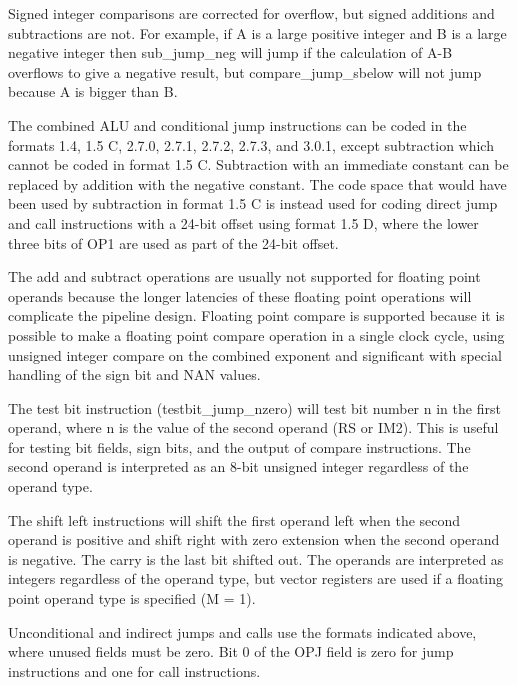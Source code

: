 \documentclass[forwardcom.tex]{subfiles}
\begin{document}
Signed integer comparisons are corrected for overflow, but signed additions and subtractions are not. For example, if A is a large positive integer and B is a large negative integer then sub\_jump\_neg will jump if the calculation of A-B overflows to give a negative result, but compare\_jump\_sbelow will not jump because A is bigger than B.
\vspace{2mm}

The combined ALU and conditional jump instructions can be coded in the formats 1.4, 1.5 C, 2.7.0, 2.7.1, 2.7.2, 2.7.3, and 3.0.1, except subtraction which cannot be coded in format 1.5 C. Subtraction with an immediate constant can be replaced by addition with the negative constant. The code space that would have been used by subtraction in format 1.5 C is instead used for coding direct jump and call instructions with a 24-bit offset using format 1.5 D, where the lower three bits of OP1 are used as part of the 24-bit offset.
\vspace{2mm}

The add and subtract operations are usually not supported for floating point operands because the longer latencies of these floating point operations will complicate the pipeline design. Floating point compare is supported because it is possible to make a floating point compare operation in a single clock cycle, using unsigned integer compare on the combined exponent and significant with special handling of the sign bit and NAN values.
\vspace{2mm}

The test bit instruction (testbit\_jump\_nzero) will test bit number n in the first operand, where n is the value of the second operand (RS or IM2). This is useful for testing bit fields, sign bits, and the output of compare instructions. The second operand is interpreted as an 8-bit unsigned integer regardless of the operand type.
\vspace{2mm}

The shift left instructions will shift the first operand left when the second operand is positive and shift right with zero extension when the second operand is negative. The carry is the last bit shifted out. The operands are interpreted as integers regardless of the operand type, but vector registers are used if a floating point operand type is specified (M = 1).
\vspace{2mm}

Unconditional and indirect jumps and calls use the formats indicated above, where unused fields must be zero. Bit 0 of the OPJ field is zero for jump instructions and one for call instructions.
\vspace{2mm}
\end{document}
